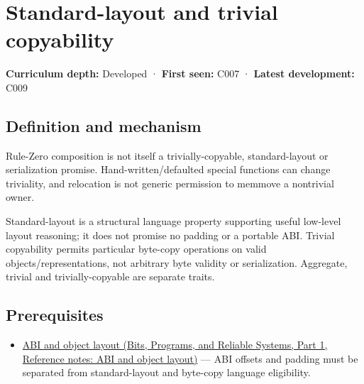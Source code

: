 \hypertarget{appendix-958870a64c53}{}\label{referencestart:appendix-958870a64c53}
\section{Standard-layout and trivial copyability}\label{appendix-958870a64c53-standard-layout-and-trivial-copyability}

\hypertarget{appendix-958870a64c53-standard-layout-and-trivial-copyability}{}

\textbf{Curriculum depth:} Developed · \textbf{First seen:} C007 · \textbf{Latest development:} C009

\begin{allmightroledefinition}

\subsection{Definition and mechanism}\label{appendix-958870a64c53-definition-and-mechanism}

\hypertarget{appendix-958870a64c53-definition-and-mechanism}{}

Rule-Zero composition is not itself a trivially-copyable, standard-layout or serialization promise. Hand-written/defaulted special functions can change triviality, and relocation is not generic permission to memmove a nontrivial owner.

\end{allmightroledefinition}

Standard-layout is a structural language property supporting useful low-level layout reasoning; it does not promise no padding or a portable ABI. Trivial copyability permits particular byte-copy operations on valid objects/representations, not arbitrary byte validity or serialization. Aggregate, trivial and trivially-copyable are separate traits.

\subsection{Prerequisites}\label{appendix-958870a64c53-prerequisites}

\hypertarget{appendix-958870a64c53-prerequisites}{}

\begin{itemize}
\tightlist
\item
  \href{../01-Bits-Programs-and-Reliable-Systems-P01/main.pdf\#nameddest=appendix-c4ac6bb0fff8}{ABI and object layout (Bits, Programs, and Reliable Systems, Part 1, Reference notes: ABI and object layout)} --- ABI offsets and padding must be separated from standard-layout and byte-copy language eligibility.
\end{itemize}


